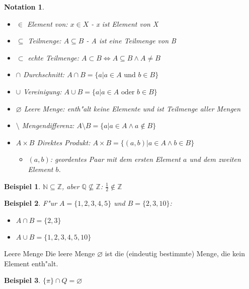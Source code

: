 \documentclass[11pt]{article}
\newcommand{\gq}[1]{\glqq{}#1\grqq{}} %
\newtheorem{exa}{Beispiel}[section]
\newtheorem*{notation}{Notation}
\begin{document}
\begin{notation}\
\begin{itemize}
\item \(\in\) Element von: \(x\in X\) - \gq{x ist Element von X}
\item \(\subseteq\) Teilmenge: \(A\subseteq B\) - \gq{A ist eine Teilmenge von B}
\item \(\subset\) echte Teilmenge: \(A\subset B \iff A\subseteq B \land A \neq B\)
\item \(\cap\) Durchschnitt: \(A\cap B = \{a|a\in A \text{ und } b\in B\}\)
\item \(\cup\) Vereinigung: \(A\cup B = \{a|a\in A \text{ oder } b\in B\}\)
\item \(\varnothing\) Leere Menge: enth"alt keine Elemente und ist Teilmenge aller Mengen
\item \(\setminus\) Mengendifferenz: \( A\setminus B = \{a|a\in A \land a\notin B \} \)
\item \(A\times B\) Direktes Produkt: \(A \times B = \{(a,b)|a\in A\land b\in B \} \)
\begin{itemize}
	\item \((a,b)\): geordentes Paar mit dem ersten Element \(a\) und dem zweiten
	Element \(b\).
\end{itemize}
\end{itemize}
\end{notation}

\begin{exa}
\(\mathbb{N}\subseteq \mathbb{Z}\), aber \(\mathbb{Q} \nsubseteq \mathbb{Z}\): \(\frac{1}{2} \notin \mathbb{Z}\)
\end{exa}

\begin{exa}
F"ur \(A = \{1,2,3,4,5\}\) und \(B = \{2,3,10\}\):
\begin{itemize}
\item \(A\cap B = \{2,3\}\)
\item \(A\cup B = \{1,2,3,4,5,10\}\)
\end{itemize}
\end{exa}

\begin{definition}{Leere Menge}{}
Die leere Menge \(\varnothing\) ist die (eindeutig bestimmte) Menge, die kein Element enth"alt.
\end{definition}

\begin{exa}
\(\{\pi\} \cap Q = \varnothing\)
\end{exa}
\end{document}
